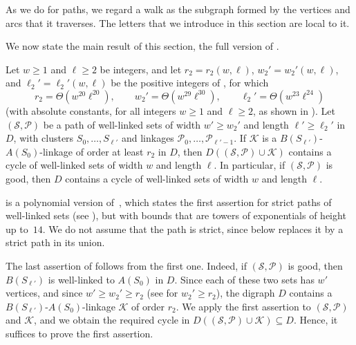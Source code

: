 \documentclass[fontsize=12pt,leading=14pt]{fullpaper}
\newcommand{\Kcal}{\mathcal{K}}
\newcommand{\Pcal}{\mathcal{P}}
\newcommand{\Scal}{\mathcal{S}}
\begin{document}
As we do for paths, we regard a walk as the subgraph formed by the vertices and arcs that it traverses.
The letters that we introduce in this section are local to it.

We now state the main result of this section, the full version of .

\begin{theorem}[manual-num=\ref*{thm:intro-stage2}, note={Stage~2, full version}]\label{thm:closing}
  Let $w\ge1$ and $\ell\ge2$ be integers, and let $r_2=r_2(w,\ell)$, $w_2'=w_2'(w,\ell)$, and $\ell_2'=\ell_2'(w,\ell)$ be the positive integers of , for which
  \[
    r_2=\Theta(w^{20}\ell^{20}),\qquad w_2'=\Theta(w^{29}\ell^{30}),\qquad\ell_2'=\Theta(w^{23}\ell^{24})
  \]
  (with absolute constants, for all integers $w\ge1$ and $\ell\ge2$, as shown in ).
  Let $(\Scal,\Pcal)$ be a path of well-linked sets of width $w'\ge w_2'$ and length $\ell'\ge\ell_2'$ in $D$, with clusters $S_0,\dots,S_{\ell'}$ and linkages $\Pcal_0,\dots,\Pcal_{\ell'-1}$.
  If $\Kcal$ is a $B(S_{\ell'})$-$A(S_0)$-linkage of order at least $r_2$ in $D$, then $D((\Scal,\Pcal)\cup\Kcal)$ contains a cycle of well-linked sets of width $w$ and length $\ell$.
  In particular, if $(\Scal,\Pcal)$ is good, then $D$ contains a cycle of well-linked sets of width $w$ and length $\ell$.
\end{theorem}

 is a polynomial version of~\cite[Theorem~1.2]{HKMM26b}, which states the first assertion for strict paths of well-linked sets (see ), but with bounds that are towers of exponentials of height up to~$14$.
We do not assume that the path is strict, since  below replaces it by a strict path in its union.

The last assertion of  follows from the first one.
Indeed, if $(\Scal,\Pcal)$ is good, then $B(S_{\ell'})$ is well-linked to $A(S_0)$ in $D$.
Since each of these two sets has $w'$ vertices, and since $w'\ge w_2'\ge r_2$ (see  for $w_2'\ge r_2$), the digraph $D$ contains a $B(S_{\ell'})$-$A(S_0)$-linkage $\Kcal$ of order $r_2$.
We apply the first assertion to $(\Scal,\Pcal)$ and $\Kcal$, and we obtain the required cycle in $D((\Scal,\Pcal)\cup\Kcal)\subseteq D$.
Hence, it suffices to prove the first assertion.
\end{document}
